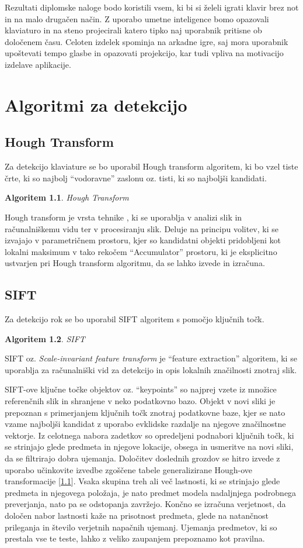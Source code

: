 \documentclass[a4paper,12pt,openright]{book}
\newtheorem{algoritem}{Algoritem}[chapter]
\begin{document}
Rezultati diplomske naloge bodo koristili vsem, ki bi si želeli igrati klavir brez not in na malo drugačen način. Z uporabo umetne inteligence bomo opazovali klaviaturo in na steno projecirali katero tipko naj uporabnik pritisne ob določenem času. Celoten izdelek spominja na arkadne igre, saj mora uporabnik upoštevati tempo glasbe in opazovati projekcijo, kar tudi vpliva na motivacijo izdelave aplikacije.


\chapter{Algoritmi za detekcijo}
\label{ch1}
\section{Hough Transform}
Za detekcijo klaviature se bo uporabil Hough transform algoritem, ki bo vzel tiste črte, ki so najbolj \enquote{vodoravne}  zaslonu oz. tisti, ki so najboljši kandidati. \cite{hough}
\begin{algoritem}
\label{iz:1}
Hough Transform
\end{algoritem}

Hough transform je vrsta tehnike , ki se uporablja v analizi slik in računalniškemu vidu ter v procesiranju slik. Deluje na principu volitev, ki se izvajajo v parametričnem prostoru, kjer so kandidatni objekti pridobljeni kot lokalni maksimum v tako rekočem \enquote{Accumulator} prostoru, ki je eksplicitno ustvarjen pri Hough transform algoritmu, da se lahko izvede in izračuna.
\clearpage
\section{SIFT}
\noindent Za detekcijo rok se bo uporabil SIFT algoritem s pomočjo ključnih točk.
\begin{algoritem}
\label{iz:2}
SIFT
\end{algoritem}
SIFT oz. \textit{Scale-invariant feature transform} je \enquote{feature extraction} algoritem, ki se uporablja za računalniški vid za detekcijo in opis lokalnih značilnosti znotraj slik. 

SIFT-ove ključne točke objektov oz. \enquote{keypoints} so najprej vzete iz množice referenčnih slik in shranjene v neko podatkovno bazo. Objekt v novi sliki je prepoznan s primerjanjem ključnih točk znotraj podatkovne baze, kjer se nato vzame najboljši kandidat z uporabo evklidske razdalje na njegove značilnostne vektorje. Iz celotnega nabora zadetkov so opredeljeni podnabori ključnih točk, ki se strinjajo glede predmeta in njegove lokacije, obsega in usmeritve na novi sliki, da se filtrirajo dobra ujemanja. Določitev doslednih grozdov se hitro izvede z uporabo učinkovite izvedbe zgoščene tabele generalizirane Hough-ove transformacije [\ref{iz:1}]. Vsaka skupina treh ali več lastnosti, ki se strinjajo glede predmeta in njegovega položaja, je nato predmet modela nadaljnjega podrobnega preverjanja, nato pa se odstopanja zavržejo. Končno se izračuna verjetnost, da določen nabor lastnosti kaže na prisotnost predmeta, glede na natančnost prileganja in število verjetnih napačnih ujemanj. Ujemanja predmetov, ki so prestala vse te teste, lahko z veliko zaupanjem prepoznamo kot pravilna.
\end{document}
